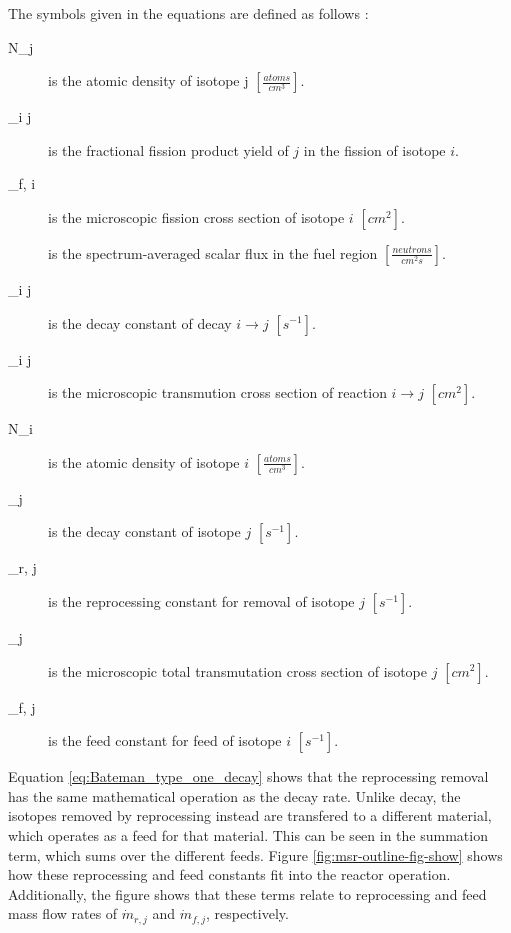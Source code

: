 The symbols given in the equations are defined as follows \cite{leppanen_development_2007}:
\begin{description}
\item[N_j] is the atomic density of isotope j $\left[\frac{atoms}{cm^3}\right]$.
\item[\gamma_{i \rightarrow j}] is the fractional fission product yield of $j$ in the fission of isotope $i$.
\item[\sigma_{f, i}] is the microscopic fission cross section of isotope $i$ $\left[cm^2\right]$.
\item[\Phi] is the spectrum-averaged scalar flux in the fuel region $\left[\frac{neutrons}{cm^2 s}\right]$.
\item[\lambda _{i \rightarrow j}] is the decay constant of decay $i \rightarrow j$ $\left[s^{-1}\right]$.
\item[\sigma_{i \rightarrow j}] is the microscopic transmution cross section of reaction $i \rightarrow j$ $\left[cm^2\right]$.
\item[N_i] is the atomic density of isotope $i$ $\left[\frac{atoms}{cm^3}\right]$.
\item[\lambda_j] is the decay constant of isotope $j$ $\left[s^{-1}\right]$.
\item[\lambda_{r, j}] is the reprocessing constant for removal of isotope $j$ $\left[s^{-1}\right]$.
\item[\sigma_j] is the microscopic total transmutation cross section of isotope $j$ $\left[cm^2\right]$.
\item[\lambda _{f, j}] is the feed constant for feed of isotope $i$ $\left[s^{-1}\right]$.
\end{description}

Equation \eqref{eq:Bateman_type_one_decay} shows that the reprocessing removal has the same mathematical operation as the decay rate. Unlike decay, the isotopes removed by reprocessing instead are transfered to a different material, which operates as a feed for that material. This can be seen in the summation term, which sums over the different feeds. Figure \ref{fig:msr-outline-fig-show} shows how these reprocessing and feed constants fit into the reactor operation. Additionally, the figure shows that these terms relate to reprocessing and feed mass flow rates of $\dot{m}_{r, j}$ and $\dot{m}_{f, j}$, respectively.


